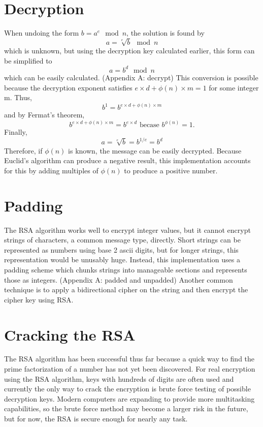 \documentclass{article}
\begin{document}
	\section{Decryption}
		When undoing the form $ b = a^e \mod n $, the solution is found by \[ a = \sqrt[e]{b} \mod n \] which is unknown, but using the decryption key calculated earlier, this form can be simplified to \[ a = b^d \mod n \] which can be easily calculated. (Appendix A: decrypt) This conversion is possible because the decryption exponent satisfies $ e \times d + \phi(n) \times m = 1 $ for some integer m. Thus, \[ b^1 = b^{e \times d + \phi(n) \times m} \] and by Fermat's theorem, \[ b^{e \times d + \phi(n) \times m} = b^{e \times d} \text{ becase } b^{\phi(n)} = 1. \] Finally, \[ a = \sqrt[e]{b} = b^{1/e} = b^d \] Therefore, if $\phi(n)$ is known, the message can be easily decrypted. Because Euclid's algorithm can produce a negative result, this implementation accounts for this by adding multiples of $\phi(n)$ to produce a positive number.
		
	\section{Padding}
		The RSA algorithm works well to encrypt integer values, but it cannot encrypt strings of characters, a common message type, directly. Short strings can be represented as numbers using base 2 ascii digits, but for longer strings, this representation would be unusably huge. Instead, this implementation uses a padding scheme which chunks strings into manageable sections and represents those as integers. (Appendix A: padded and unpadded) Another common technique is to apply a bidirectional cipher on the string and then encrypt the cipher key using RSA.
	
	\section{Cracking the RSA}
		The RSA algorithm has been successful thus far because a quick way to find the prime factorization of a number has not yet been discovered. For real encryption using the RSA algorithm, keys with hundreds of digits are often used and currently the only way to crack the encryption is brute force testing of possible decryption keys. Modern computers are expanding to provide more multitasking capabilities, so the brute force method may become a larger risk in the future, but for now, the RSA is secure enough for nearly any task.
	
\end{document}
